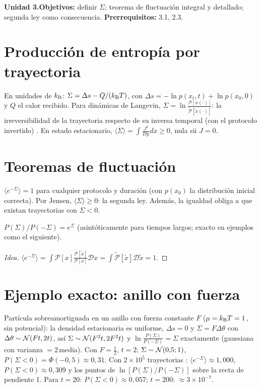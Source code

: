 \documentclass[11pt,a4paper]{article}
\begin{document}

\noindent\textbf{Unidad 3.}\quad\textbf{Objetivos:} definir $\Sigma$; teorema de fluctuación integral y detallado; segunda ley como
consecuencia. \textbf{Prerrequisitos:} 3.1, 2.3.

\section{Producción de entropía por trayectoria}
En unidades de $k_{\mathrm B}$: $\Sigma=\Delta s-Q/(k_{\mathrm B} T)$, con $\Delta s=-\ln p(x_t,t)+\ln p(x_0,0)$ y $Q$ el calor recibido. Para dinámicas de
Langevin, $\Sigma=\ln\frac{\mathcal P[x(\cdot)]}{\tilde{\mathcal P}[\tilde x(\cdot)]}$: la irreversibilidad de la trayectoria respecto de su inversa
temporal (con el protocolo invertido) \cite{seifert}. En estado estacionario, $\langle\dot\Sigma\rangle=\int\frac{J^2}{Dp}dx\ge0$, nula sii $J=0$.

\section{Teoremas de fluctuación}
\begin{resultado}[ (integral)]
$\langle e^{-\Sigma}\rangle=1$ para cualquier protocolo y duración (con $p(x_0)$ la distribución inicial correcta). Por Jensen,
$\langle\Sigma\rangle\ge0$: la segunda ley. Además, la igualdad obliga a que existan trayectorias con $\Sigma<0$.
\end{resultado}
\begin{resultado}
$P(\Sigma)/P(-\Sigma)=e^{\Sigma}$ (asintóticamente para tiempos largos; exacto en ejemplos como el siguiente).
\end{resultado}
\begin{proof}[Idea]
$\langle e^{-\Sigma}\rangle=\int\mathcal P[x]\frac{\tilde{\mathcal P}[\tilde x]}{\mathcal P[x]}\mathcal Dx=\int\tilde{\mathcal P}[\tilde x]\mathcal D\tilde x=1$.
\end{proof}

\section{Ejemplo exacto: anillo con fuerza}
Partícula sobreamortiguada en un anillo con fuerza constante $F$ ($\mu=k_{\mathrm B} T=1$, sin potencial): la densidad estacionaria es uniforme,
$\Delta s=0$ y $\Sigma=F\Delta\theta$ con $\Delta\theta\sim\mathcal{N}(Ft,2t)$, así $\Sigma\sim\mathcal{N}(F^2t,2F^2t)$ y $\ln\frac{P(\Sigma)}{P(-\Sigma)}=\Sigma$ exactamente
(gaussiana con varianza $=2\,$media). Con $F=\frac12$, $t=2$: $\Sigma\sim\mathcal{N}(0{,}5;1)$, $P(\Sigma<0)=\Phi(-0{,}5)\approx0{,}31$. Con
$2\times10^5$ trayectorias \evS: $\langle e^{-\Sigma}\rangle\approx1{,}000$, $P(\Sigma<0)\approx0{,}309$ y los puntos de $\ln[P(\Sigma)/P(-\Sigma)]$ sobre la
recta de pendiente 1. Para $t=20$: $P(\Sigma<0)\approx0{,}057$; $t=200$: $\approx3\times10^{-7}$.
\end{document}
